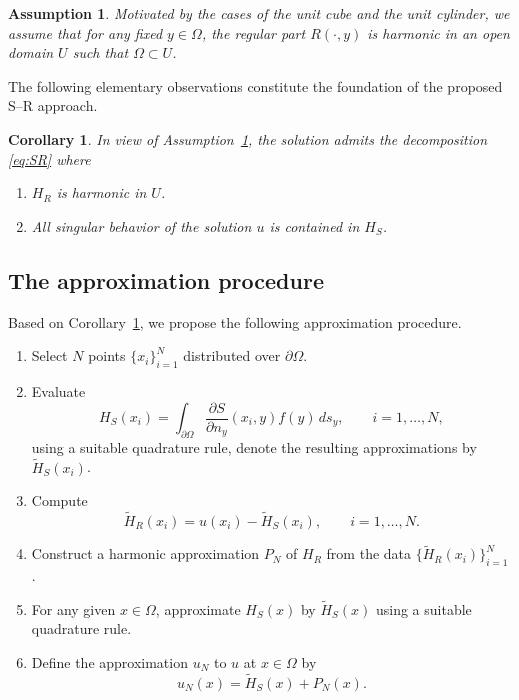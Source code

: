 \documentclass[12pt,oneside,reqno]{amsart}%
\theoremstyle{plain}
\newtheorem{corollary}[theorem]{Corollary}
\newtheorem{assumption}[theorem]{Assumption}
\numberwithin{equation}{section}
\begin{document}
\begin{assumption}\label{Rassumption}
Motivated by the cases of the unit cube and the unit cylinder, 
we assume that for any fixed $y \in \Omega$, 
the regular part $R(\cdot, y)$ is harmonic in an open domain $U$ 
such that $\Omega \subset U$.
\end{assumption}

The following elementary observations constitute the foundation
of the proposed S--R approach.

\begin{corollary}\label{maincor}
In view of Assumption~\ref{Rassumption},
the solution admits the decomposition \eqref{eq:SR} 
where 
\begin{enumerate}
\renewcommand{\labelenumi}{(\Alph{enumi})}
\item $H_R$ is harmonic in $U$.
\item All singular behavior of the solution $u$ is contained in $H_S$.
\end{enumerate}
\end{corollary}

\subsection{The approximation procedure}\hfill

Based on Corollary~\ref{maincor}, we propose the following
approximation procedure.

\begin{enumerate}
\item Select $N$ points $\{x_i\}_{i=1}^N$ distributed over $\partial\Omega$.

\item Evaluate
\begin{equation}\label{tildeHS}
H_S(x_i)=\int_{\partial\Omega}
    \frac{\partial S}{\partial n_y}(x_i,y)f(y)\, ds_y,
\qquad i=1,\ldots,N,
\end{equation}
using a suitable quadrature rule, denote the resulting approximations by $\tilde H_S(x_i)$.

\item Compute
\begin{equation}\label{HRtilde}
\tilde H_R(x_i)=u(x_i)-\tilde H_S(x_i),
\qquad i=1,\ldots,N.
\end{equation}

\item Construct a harmonic approximation $P_N$ of $H_R$
from the data $\{\tilde H_R(x_i)\}_{i=1}^N$.

\item For any given $x\in\Omega$, approximate $H_S(x)$
by $\tilde H_S(x)$ using a suitable quadrature rule.

\item Define the approximation $u_N$ to $u$ at $x\in\Omega$ by
\begin{equation}\label{uN}
u_N(x)=\tilde H_S(x)+P_N(x).
\end{equation}
\end{enumerate}
\end{document}
